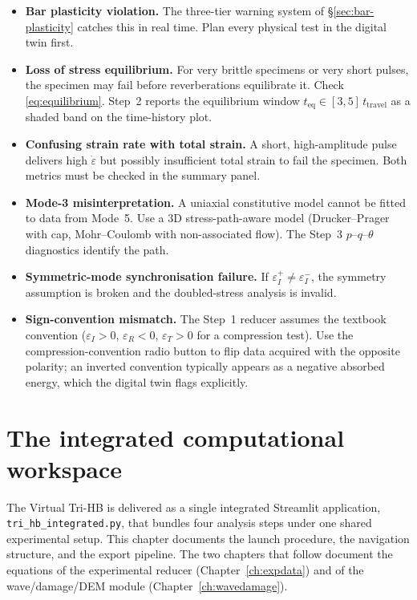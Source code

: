 \documentclass[11pt,a4paper,openany]{book}
\theoremstyle{handbook}
\newcommand{\eps}{\varepsilon}
\newcommand{\epsdot}{\dot\eps}
\begin{document}
\begin{itemize}[leftmargin=*,itemsep=3pt]
  \item \textbf{Bar plasticity violation.} The three-tier warning system of
        \S\ref{sec:bar-plasticity} catches this in real time. Plan every
        physical test in the digital twin first.
  \item \textbf{Loss of stress equilibrium.} For very brittle specimens or
        very short pulses, the specimen may fail before reverberations
        equilibrate it. Check \eqref{eq:equilibrium}. Step~2 reports the
        equilibrium window $t_{\text{eq}}\in[3,5]\,t_{\text{travel}}$ as a
        shaded band on the time-history plot.
  \item \textbf{Confusing strain rate with total strain.} A short,
        high-amplitude pulse delivers high $\epsdot$ but possibly
        insufficient total strain to fail the specimen. Both metrics must
        be checked in the summary panel.
  \item \textbf{Mode-3 misinterpretation.} A uniaxial constitutive model
        cannot be fitted to data from Mode~5. Use a 3D stress-path-aware
        model (Drucker--Prager with cap, Mohr--Coulomb with non-associated
        flow). The Step~3 $p$--$q$--$\theta$ diagnostics identify the
        path.
  \item \textbf{Symmetric-mode synchronisation failure.} If
        $\eps_I^{+}\neq\eps_I^{-}$, the symmetry assumption is broken and
        the doubled-stress analysis is invalid.
  \item \textbf{Sign-convention mismatch.} The Step~1 reducer assumes the
        textbook convention ($\eps_I>0$, $\eps_R<0$, $\eps_T>0$ for a
        compression test). Use the compression-convention radio button to
        flip data acquired with the opposite polarity; an inverted
        convention typically appears as a negative absorbed energy, which
        the digital twin flags explicitly.
\end{itemize}

\chapter{The integrated computational workspace}\label{ch:integrated}

The Virtual Tri-HB is delivered as a single integrated Streamlit
application, \texttt{tri\_hb\_integrated.py}, that bundles four analysis
steps under one shared experimental setup. This chapter documents the
launch procedure, the navigation structure, and the export pipeline. The
two chapters that follow document the equations of the experimental
reducer (Chapter~\ref{ch:expdata}) and of the wave/damage/DEM module
(Chapter~\ref{ch:wavedamage}).
\end{document}
